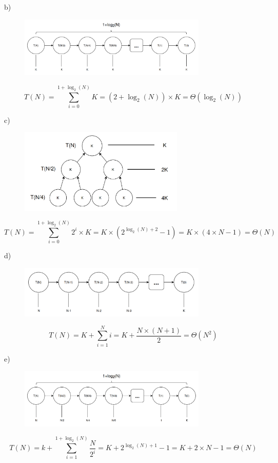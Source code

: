 \documentclass[a4paper,11pt]{article}
\begin{document}
	\noindent b)
	
	\begin{figure}[h]
		\centering
		\includegraphics[width=0.8\textwidth]{imgs/2_1-b}
		\label{fig:2_1-b}
	\end{figure}
	\[
		T(N) = \sum_{i=0}^{1 + \log_2(N)} K = (2 + \log_2(N)) \times K = \Theta(\log_2(N))
	\]
	
	\noindent c)
	
	\begin{figure}[h]
		\centering
		\includegraphics[width=0.7\textwidth]{imgs/2_1-c}
		\label{fig:2_1-c}
	\end{figure}
	\[
		T(N) = \sum_{i=0}^{1 + \log_2(N)} 2^i \times K = K \times (2^{\log_2(N) + 2} - 1) = K \times (4 \times N - 1) = \Theta(N)
	\]
	
	\noindent d)
	
	\begin{figure}[h]
		\centering
		\includegraphics[width=0.8\textwidth]{imgs/2_1-d}
		\label{fig:2_1-d}
	\end{figure}
	\[
		T(N) = K + \sum_{i=1}^{N} i = K + \frac{N \times (N + 1)}{2} = \Theta(N^2)
	\]
	
	\noindent e)
	
	\begin{figure}[h]
		\centering
		\includegraphics[width=0.8\textwidth]{imgs/2_1-e}
		\label{fig:2_1-e}
	\end{figure}
	\[
		T(N) = k + \sum_{i=1}^{1 + \log_2(N)} \frac{N}{2^i} = K + 2^{\log_2(N) + 1} - 1 = K + 2 \times N - 1 = \Theta(N)
	\]
	
\end{document}
